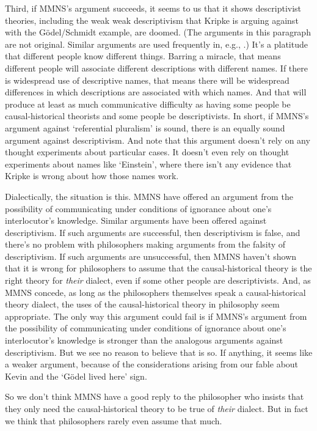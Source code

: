Third, if MMNS's argument succeeds, it seems to us that it shows descriptivist theories, including the weak weak descriptivism that Kripke is arguing against with the G\"{o}del\-/\-Schmidt example, are doomed. (The arguments in this paragraph are not original. Similar arguments are used frequently in, e.g., \citet{FodorLepore1992}.) It's a platitude that different people know different things. Barring a miracle, that means different people will associate different descriptions with different names. If there is widespread use of descriptive names, that means there will be widespread differences in which descriptions are associated with which names. And that will produce at least as much communicative difficulty as having some people be causal-historical theorists and some people be descriptivists. In short, if MMNS's argument against `referential pluralism' is sound, there is an equally sound argument against descriptivism. And note that this argument doesn't rely on any thought experiments about particular cases. It doesn't even rely on thought experiments about names like `Einstein', where there isn't any evidence that Kripke is wrong about how those names work.

Dialectically, the situation is this. MMNS have offered an argument from the possibility of communicating under conditions of ignorance about one's interlocutor's knowledge. Similar arguments have been offered against descriptivism. If such arguments are successful, then descriptivism is false, and there's no problem with philosophers making arguments from the falsity of descriptivism. If such arguments are unsuccessful, then MMNS haven't shown that it is wrong for philosophers to assume that the causal-historical theory is the right theory for \textit{their} dialect, even if some other people are descriptivists. And, as MMNS concede, as long as the philosophers themselves speak a causal-historical theory dialect, the uses of the causal-historical theory in philosophy seem appropriate. The only way this argument could fail is if MMNS's argument from the possibility of communicating under conditions of ignorance about one's interlocutor's knowledge is stronger than the analogous arguments against descriptivism. But we see no reason to believe that is so. If anything, it seems like a weaker argument, because of the considerations arising from our fable about Kevin and the `G\"{o}del lived here' sign.

So we don't think MMNS have a good reply to the philosopher who insists that they only need the causal-historical theory to be true of \textit{their} dialect. But in fact we think that philosophers rarely even assume that much.

